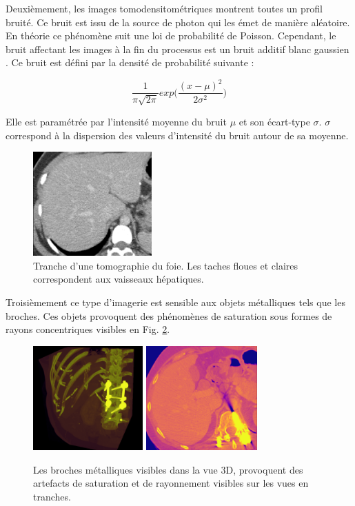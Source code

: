 Deuxièmement, les images tomodensitométriques montrent toutes un profil bruité. Ce bruit est issu de la source de photon qui les émet de manière aléatoire. En théorie ce phénomène suit une loi de probabilité de Poisson. Cependant, le bruit affectant les images à la fin du processus est un bruit additif blanc gaussien \cite{Lei1992_gaussianNoiseCT}. Ce bruit est défini par la densité de probabilité suivante :

\begin{equation}
\frac{1}{\pi \sqrt{2\pi} } exp\big( \frac{ (x-\mu)^2}{2\sigma^2} )    
\end{equation}

Elle est paramétrée par l'intensité moyenne du bruit $\mu$ et son écart-type $\sigma$. $\sigma$ correspond à la dispersion des valeurs d'intensité du bruit autour de sa moyenne.

\begin{figure}
    \centering
    \includegraphics[height=4cm]{Images/noise_CT.png}
    \caption{Tranche d'une tomographie du foie. Les taches floues et claires correspondent aux vaisseaux hépatiques.}
    \label{fig:CT_noise}
\end{figure}

Troisièmement ce type d'imagerie est sensible aux objets métalliques tels que les broches. Ces objets provoquent des phénomènes de saturation sous formes de rayons concentriques visibles en Fig. \ref{fig:metallic artefacts}.

\begin{figure}
    \centering
    \includegraphics[height=4cm]{Images/broaches_CT.png}
    \includegraphics[height=4cm]{Images/broaches_CT_slice.png}
    \caption{Les broches métalliques visibles dans la vue 3D, provoquent des artefacts de saturation et de rayonnement visibles sur les vues en tranches.}
    \label{fig:metallic artefacts}
\end{figure}

